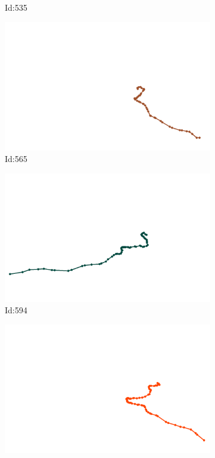 \documentclass[12pt,twoside]{report}
\begin{document}
\begin{figure}
\begin{subfigure}[b]{0.20\textwidth}
\caption{Id:535}
\end{subfigure}
\begin{subfigure}[b]{0.20\textwidth}
\centering
\includegraphics[width=\textwidth]{../trajectories/565.png}
\caption{Id:565}
\end{subfigure}
\begin{subfigure}[b]{0.20\textwidth}
\centering
\includegraphics[width=\textwidth]{../trajectories/594.png}
\caption{Id:594}
\end{subfigure}
\begin{subfigure}[b]{0.20\textwidth}
\centering
\includegraphics[width=\textwidth]{../trajectories/611.png}

\end{subfigure}
\end{figure}
\end{document}
